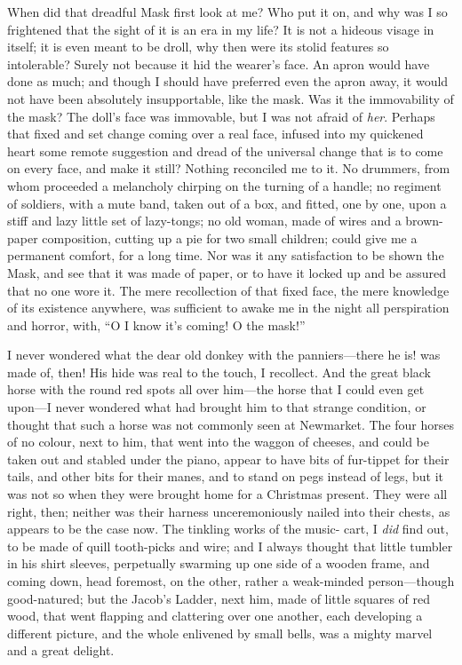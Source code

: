 When did that dreadful Mask first look at me?  Who put it on, and
why was I so frightened that the sight of it is an era in my life?
It is not a hideous visage in itself; it is even meant to be droll,
why then were its stolid features so intolerable?  Surely not
because it hid the wearer's face.  An apron would have done as much;
and though I should have preferred even the apron away, it would not
have been absolutely insupportable, like the mask.  Was it the
immovability of the mask?  The doll's face was immovable, but I was
not afraid of \emph{her}.  Perhaps that fixed and set change coming over a
real face, infused into my quickened heart some remote suggestion
and dread of the universal change that is to come on every face, and
make it still?  Nothing reconciled me to it.  No drummers, from whom
proceeded a melancholy chirping on the turning of a handle; no
regiment of soldiers, with a mute band, taken out of a box, and
fitted, one by one, upon a stiff and lazy little set of lazy-tongs;
no old woman, made of wires and a brown-paper composition, cutting
up a pie for two small children; could give me a permanent comfort,
for a long time.  Nor was it any satisfaction to be shown the Mask,
and see that it was made of paper, or to have it locked up and be
assured that no one wore it.  The mere recollection of that fixed
face, the mere knowledge of its existence anywhere, was sufficient
to awake me in the night all perspiration and horror, with, ``O I
know it's coming!  O the mask!''

I never wondered what the dear old donkey with the panniers---there
he is! was made of, then!  His hide was real to the touch, I
recollect.  And the great black horse with the round red spots all
over him---the horse that I could even get upon---I never wondered
what had brought him to that strange condition, or thought that such
a horse was not commonly seen at Newmarket.  The four horses of no
colour, next to him, that went into the waggon of cheeses, and could
be taken out and stabled under the piano, appear to have bits of
fur-tippet for their tails, and other bits for their manes, and to
stand on pegs instead of legs, but it was not so when they were
brought home for a Christmas present.  They were all right, then;
neither was their harness unceremoniously nailed into their chests,
as appears to be the case now.  The tinkling works of the music-%
cart, I \emph{did} find out, to be made of quill tooth-picks and wire; and
I always thought that little tumbler in his shirt sleeves,
perpetually swarming up one side of a wooden frame, and coming down,
head foremost, on the other, rather a weak-minded person---though
good-natured; but the Jacob's Ladder, next him, made of little
squares of red wood, that went flapping and clattering over one
another, each developing a different picture, and the whole
enlivened by small bells, was a mighty marvel and a great delight.

